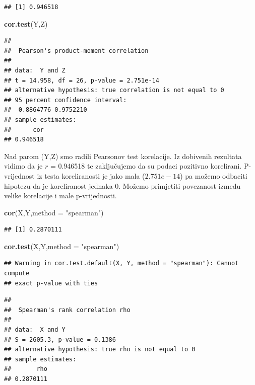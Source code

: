\documentclass[]{article}
\newenvironment{Shaded}{\begin{snugshade}}{\end{snugshade}}
\newcommand{\KeywordTok}[1]{\textcolor[rgb]{0.13,0.29,0.53}{\textbf{{#1}}}}
\newcommand{\DataTypeTok}[1]{\textcolor[rgb]{0.13,0.29,0.53}{{#1}}}
\newcommand{\StringTok}[1]{\textcolor[rgb]{0.31,0.60,0.02}{{#1}}}
\newcommand{\NormalTok}[1]{{#1}}
\begin{document}
\begin{verbatim}
## [1] 0.946518
\end{verbatim}

\begin{Shaded}
\begin{Highlighting}[]
\KeywordTok{cor.test}\NormalTok{(Y,Z)}
\end{Highlighting}
\end{Shaded}

\begin{verbatim}
## 
##  Pearson's product-moment correlation
## 
## data:  Y and Z
## t = 14.958, df = 26, p-value = 2.751e-14
## alternative hypothesis: true correlation is not equal to 0
## 95 percent confidence interval:
##  0.8864776 0.9752210
## sample estimates:
##      cor 
## 0.946518
\end{verbatim}

Nad parom (Y,Z) smo radili Pearsonov test korelacije. Iz dobivenih
rezultata vidimo da je \(r\) = 0.946518 te zaključujemo da su podaci
pozitivno korelirani. P-vrijednost iz testa koreliranosti je jako mala
(\(2.751e-14\)) pa možemo odbaciti hipotezu da je koreliranost jednaka
0. Možemo primjetiti povezanost između velike korelacije i male
p-vrijednosti.

\begin{Shaded}
\begin{Highlighting}[]
\KeywordTok{cor}\NormalTok{(X,Y,}\DataTypeTok{method =} \StringTok{"spearman"}\NormalTok{)}
\end{Highlighting}
\end{Shaded}

\begin{verbatim}
## [1] 0.2870111
\end{verbatim}

\begin{Shaded}
\begin{Highlighting}[]
\KeywordTok{cor.test}\NormalTok{(X,Y,}\DataTypeTok{method =} \StringTok{"spearman"}\NormalTok{)}
\end{Highlighting}
\end{Shaded}

\begin{verbatim}
## Warning in cor.test.default(X, Y, method = "spearman"): Cannot compute
## exact p-value with ties
\end{verbatim}

\begin{verbatim}
## 
##  Spearman's rank correlation rho
## 
## data:  X and Y
## S = 2605.3, p-value = 0.1386
## alternative hypothesis: true rho is not equal to 0
## sample estimates:
##       rho 
## 0.2870111
\end{verbatim}
\end{document}
